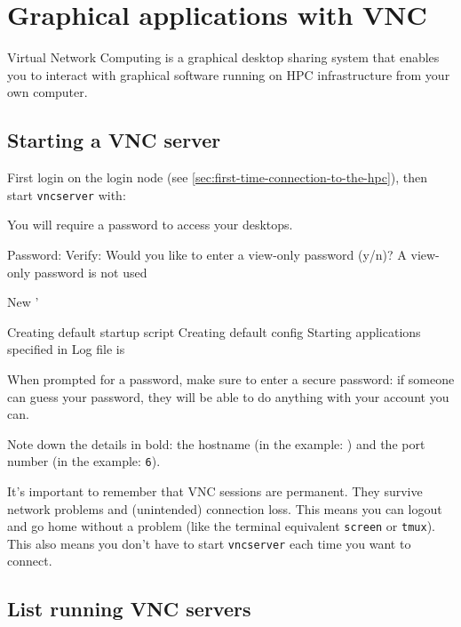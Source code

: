 \chapter{Graphical applications with VNC}
\label{ch:vnc}

Virtual Network Computing is a graphical desktop sharing system that enables you
to interact with graphical software running on HPC infrastructure from your own
computer.

\section{Starting a VNC server}
\label{sec:start-vnc}

First login on the login node (see \autoref{sec:first-time-connection-to-the-hpc}),
then start \lstinline|vncserver| with:

\begin{prompt}
You will require a password to access your desktops.

Password:%
Verify:%
Would you like to enter a view-only password (y/n)? %
A view-only password is not used

New '%

Creating default startup script %
Creating default config %
Starting applications specified in %
Log file is %

\end{prompt}

When prompted for a password, make sure to enter a secure password: if someone
can guess your password, they will be able to do anything with your account you can.

Note down the details in bold: the hostname (in the example: \texttt{\loginhost{}})
and the port number (in the example: \lstinline|6|).

It's important to remember that VNC sessions are permanent. They survive network
problems and (unintended) connection loss. This means you can logout and go home
without a problem (like the terminal equivalent \lstinline|screen| or \lstinline|tmux|).
This also means you don't have to start \lstinline|vncserver| each time you want to connect.

\section{List running VNC servers}
\label{sec:list-vnc}

